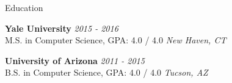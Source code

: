 \documentclass[
	a4paper,  %
	11pt,  %
]{resume}  %
\begin{document}

\begin{rSection}{Education}
	
	\textbf{Yale University} \hfill \textit{ 2015 - 2016 } \\ 
	{ M.S. in Computer Science, GPA: 4.0 / 4.0 } \hfill \textit{ New Haven, CT }

	\textbf{University of Arizona} \hfill \textit{ 2011 - 2015 } \\ 
	{ B.S. in Computer Science, GPA: 4.0 / 4.0 } \hfill \textit{Tucson, AZ}
	
\end{rSection}

\end{document}
